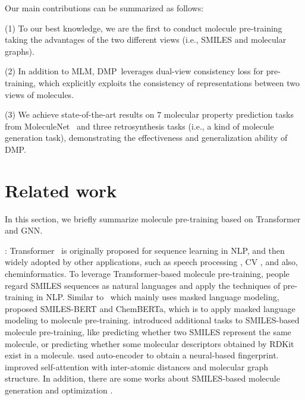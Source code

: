 \documentclass{article}
\newcommand{\ourM}{DMP}
\begin{document}
Our main contributions can be summarized as follows:

\noindent(1) To our best knowledge, we are the first to conduct molecule pre-training taking the advantages of the two different views (i.e., SMILES and molecular graphs).

\noindent(2) In addition to MLM, \ourM{}~leverages dual-view consistency loss for pre-training, which explicitly exploits the consistency of representations between two views of molecules.

\noindent(3) We achieve state-of-the-art results on $7$ molecular property prediction tasks from MoleculeNet~\cite{wu2018moleculenet} and three retrosynthesis tasks (i.e., a kind of molecule generation task), demonstrating the effectiveness and generalization ability of \ourM{}. 



\section{Related work}


In this section, we briefly summarize molecule pre-training based on Transformer and GNN. 

: Transformer~\cite{vaswani2017attention} is originally proposed for sequence learning in NLP, and then widely adopted by other applications, such as speech processing \cite{8462506,NEURIPS2019_f63f65b5}, CV \citep{dosovitskiy2021an,image2018imagetransformer}, and also, cheminformatics. To leverage Transformer-based molecule pre-training, people regard SMILES sequences as natural languages and apply the techniques of pre-training in NLP. Similar to~\cite{devlin2018bert,liu2019roberta} which mainly uses masked language modeling, \citet{wang2019smiles} proposed SMILES-BERT and \citet{chithrananda2020chemberta} ChemBERTa, which is to apply masked language modeling to molecule pre-training. 
\citet{fabian2020molecular} introduced additional tasks to SMILES-based molecule pre-training, like predicting whether two SMILES represent the same molecule, or predicting whether some molecular descriptors obtained by RDKit exist in a molecule.
\citet{honda2019smiles} used auto-encoder to obtain a neural-based fingerprint. \citet{maziarka2020molecule} improved self-attention with inter-atomic distances and molecular graph structure. In addition, there are some works about SMILES-based molecule generation \citep{schwaller2019molecular,pesciullesi2020transfer} and optimization \citep{he2021transformer}. 
\end{document}
